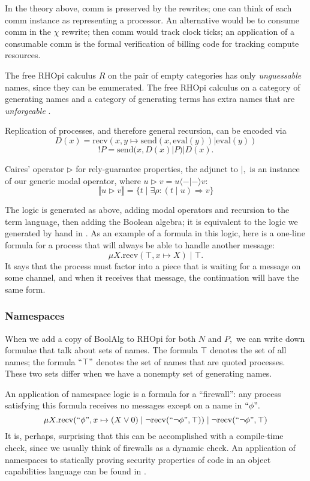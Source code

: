 \documentclass{llncs}
\newcommand{\interp}[1]{\llbracket #1 \rrbracket}
\newcommand{\maps}{\colon}
\newcommand{\send}{\mathrm{send}}
\newcommand{\recv}{\mathrm{recv}}
\renewcommand{\quote}[1]{``#1"}
\newcommand{\deref}[1]{\mathrm{eval}(#1)}
\begin{document}
In the theory above, comm is preserved by the rewrites; one can think of each comm instance as representing a processor.  An alternative would be to consume comm in the $\chi$ rewrite; then comm would track clock ticks; an application of a consumable comm is the formal verification of billing code for tracking compute resources.

The free RHOpi calculus $R$ on the pair of empty categories has only {\em unguessable} names, since they can be enumerated.  The free RHOpi calculus on a category of generating names and a category of generating terms has extra names that are {\em unforgeable} \cite{MillerYeeShapiro}.

Replication of processes, and therefore general recursion, can be encoded \cite{DBLP:journals/entcs/MeredithR05} via
\[D(x) = \recv(x, y\mapsto \send(x, \deref{y}) | \deref{y})\]
\[!P = \send(x, D(x) | P) | D(x).\]

Caires' \cite{Caires} operator $\triangleright$ for rely-guarantee properties, the adjunct to $|,$ is an instance of our generic modal operator, where $u \triangleright v = u \langle - | - \rangle v:$
\[ \interp{u \triangleright v} = \{ t \;|\; \exists \rho\maps (t\;|\;u) \Rightarrow v\} \]

The logic is generated as above, adding modal operators and recursion to the term language, then adding the Boolean algebra; it is equivalent to the logic we generated by hand in \cite{DBLP:conf/tgc/MeredithR05}.  As an example of a formula in this logic, here is a one-line formula for a process that will always be able to handle another message:
\[ \mu X. \recv(\top, x \mapsto X)\;|\;\top. \]
It says that the process must factor into a piece that is waiting for a message on some channel, and when it receives that message, the continuation will have the same form.

\subsubsection{Namespaces}

When we add a copy of BoolAlg to RHOpi for both $N$ and $P,$ we can write down formulae that talk about sets of names.  The formula $\top$ denotes the set of all names; the formula $\quote{\top}$ denotes the set of names that are quoted processes.  These two sets differ when we have a nonempty set of generating names.

An application of namespace logic is a formula for a ``firewall'': any process satisfying this formula receives no messages except on a name in $\quote{\phi}.$
\[ \mu X. \recv(\quote{\phi}, x \mapsto (X \lor 0)\;|\;\neg\recv(\quote{\neg \phi}, \top))\;|\;\neg\recv(\quote{\neg \phi}, \top) \]
It is, perhaps, surprising that this can be accomplished with a compile-time check, since we usually think of firewalls as a dynamic check.  An application of namespaces to statically proving security properties of code in an object capabilities language can be found in \cite{DBLP:journals/corr/MeredithSD13}.
\end{document}
